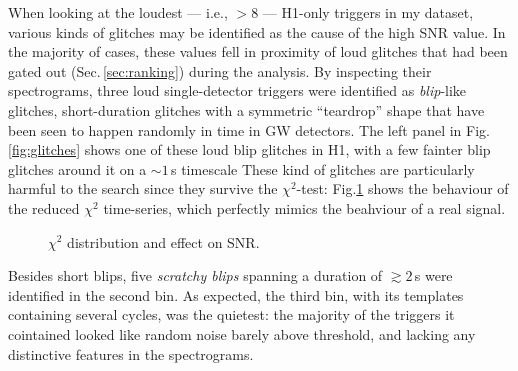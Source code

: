 \documentclass[binding=0.6cm, LaM]{sapthesis}
\begin{document}
	When looking at the loudest --- i.e., $>8$ --- H1-only triggers in my dataset,
	various kinds of glitches may be identified as the cause of the high SNR value.
	In the majority of cases, these values fell in proximity of loud glitches that had been gated out (Sec.\,\ref{sec:ranking}) during the analysis.
	By inspecting their spectrograms, three loud single-detector triggers were identified as {\it blip}-like glitches,
	short-duration glitches with a symmetric ``teardrop'' shape that have been seen to happen randomly in time in GW detectors.
	The left panel in Fig.\,\ref{fig:glitches} shows one of these loud blip glitches in H1, with a few fainter blip glitches around it on a $\sim 1\,$s timescale
        These kind of glitches are particularly harmful to the search since they survive the $\chi^2$-test: 
	Fig.\ref{fig:chisquared} shows the behaviour of the reduced $\chi^2$ time-series, which perfectly mimics the beahviour of a real signal.
	 \begin{figure}[t]
          \noindent
          \label{chisquared}
          \centering
          \caption{$\chi^2$ distribution and effect on SNR.}
          \label{fig:chisquared}
        \end{figure}
	Besides short blips, five \emph{scratchy blips} spanning a duration of $\gtrsim 2\,$s were identified in the second bin.
	As expected, the third bin, with its templates containing several cycles, was the quietest: the majority of the triggers it cointained looked like random noise barely above threshold, and 
	lacking any distinctive features in the spectrograms.
\end{document}
